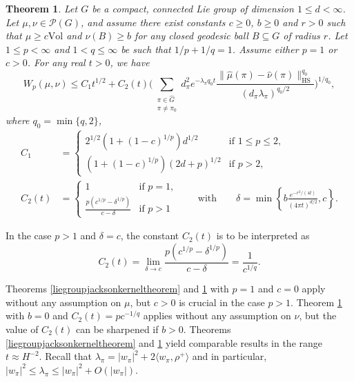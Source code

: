 \documentclass[11pt,a4paper]{article}
\newtheorem{thm}{Theorem}
\theoremstyle{definition}
\begin{document}
\begin{thm}\label{liegroupheatkerneltheorem} Let $G$ be a compact, connected Lie group of dimension $1 \le d < \infty$. Let $\mu, \nu \in \mathcal{P}(G)$, and assume there exist constants $c \ge 0$, $b \ge 0$ and $r>0$ such that $\mu \ge c \mathrm{Vol}$ and $\nu (B) \ge b$ for any closed geodesic ball $B \subseteq G$ of radius $r$. Let $1 \le p < \infty$ and $1<q \le \infty$ be such that $1/p+1/q=1$. Assume either $p=1$ or $c>0$. For any real $t>0$, we have
\[ W_p (\mu, \nu) \le C_1 t^{1/2} + C_2(t) \Bigg( \sum_{\substack{\pi \in \widehat{G} \\ \pi \neq \pi_0}} d_{\pi}^2 e^{-\lambda_{\pi} q_0 t} \frac{\| \widehat{\mu}(\pi) - \widehat{\nu}(\pi)\|_{\mathrm{HS}}^{q_0}}{(d_{\pi} \lambda_{\pi})^{q_0/2}} \Bigg)^{1/q_0} , \]
where $q_0=\min \{ q, 2 \}$,
\[ \begin{split} C_1 &= \left\{ \begin{array}{ll} 2^{1/2} (1+(1-c)^{1/p}) d^{1/2} & \textrm{if } 1 \le p \le 2, \\ (1+(1-c)^{1/p}) (2d+p)^{1/2} & \textrm{if } p>2, \end{array} \right. \\ C_2(t) &=\left\{ \begin{array}{ll} 1 & \textrm{if } p=1, \\ \frac{p(c^{1/p}-\delta^{1/p})}{c-\delta} & \textrm{if } p>1 \end{array} \right. \qquad \textrm{with} \qquad \delta=\min \left\{ b \frac{e^{-r^2 /(4t)}}{(4 \pi t)^{d/2}} , c \right\} . \end{split} \]
\end{thm}
\noindent In the case $p>1$ and $\delta=c$, the constant $C_2(t)$ is to be interpreted as
\[ C_2(t)=\lim_{\delta \to c} \frac{p(c^{1/p}-\delta^{1/p})}{c-\delta} = \frac{1}{c^{1/q}} . \]

Theorems \ref{liegroupjacksonkerneltheorem} and \ref{liegroupheatkerneltheorem} with $p=1$ and $c=0$ apply without any assumption on $\mu$, but $c>0$ is crucial in the case $p>1$. Theorem \ref{liegroupheatkerneltheorem} with $b=0$ and $C_2(t)=pc^{-1/q}$ applies without any assumption on $\nu$, but the value of $C_2(t)$ can be sharpened if $b>0$. Theorems \ref{liegroupjacksonkerneltheorem} and \ref{liegroupheatkerneltheorem} yield comparable results in the range $t \approx H^{-2}$. Recall that $\lambda_{\pi}=|w_{\pi}|^2 + 2 \langle w_{\pi}, \rho^+ \rangle$ and in particular, $|w_{\pi}|^2 \le \lambda_{\pi} \le |w_{\pi}|^2 + O(|w_{\pi}|)$.
\end{document}
